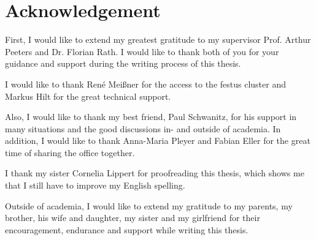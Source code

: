 \NewPage
\chapter*{Acknowledgement}
\label{chap:acknowledgement}

First, I would like to extend my greatest gratitude to my supervisor Prof. Arthur Peeters and Dr. Florian Rath. I would like to thank both of you for your guidance and support during the writing process of this thesis. \bigskip

I would like to thank René Meißner for the access to the festus cluster and Markus Hilt for the great technical support. \bigskip

Also, I would like to thank my best friend, Paul Schwanitz, for his support in many situations and the good discussions in- and outside of academia. In addition, I would like to thank Anna-Maria Pleyer and Fabian Eller for the great time of sharing the office together. \bigskip

I thank my sister Cornelia Lippert for proofreading this thesis, which shows me that I still have to improve my English spelling. \bigskip

Outside of academia, I would like to extend my gratitude to my parents, my brother, his wife and daughter, my sister and my girlfriend for their encouragement, endurance and support while writing this thesis. 